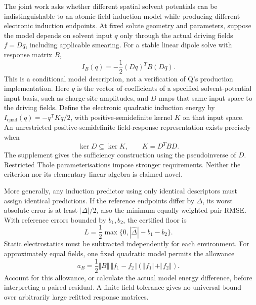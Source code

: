 \documentclass{article}
\begin{document}
The joint work asks whether different spatial solvent potentials can be indistinguishable to an atomic-field induction model while producing different electronic induction endpoints. At fixed solute geometry and parameters, suppose the model depends on solvent input $q$ only through the actual driving fields $f=Dq$, including applicable smearing. For a stable linear dipole solve with response matrix $B$,
\begin{equation*}
I_B(q)=-\frac12(Dq)^TB(Dq).
\end{equation*}
This is a conditional model description, not a verification of Q's production implementation. Here $q$ is the vector of coefficients of a specified solvent-potential input basis, such as charge-site amplitudes, and $D$ maps that same input space to the driving fields. Define the electronic quadratic induction energy by $I_{\mathrm{quad}}(q)=-q^{\mathrm T}Kq/2$, with positive-semidefinite kernel $K$ on that input space. An unrestricted positive-semidefinite field-response representation exists precisely when
\begin{equation*}
\operatorname{ker}D\subseteq\operatorname{ker}K,\qquad K=D^TBD.
\end{equation*}
The supplement gives the sufficiency construction using the pseudoinverse of $D$. Restricted Thole parameterisations impose stronger requirements. Neither the criterion nor its elementary linear algebra is claimed novel.

More generally, any induction predictor using only identical descriptors must assign identical predictions. If the reference endpoints differ by $\Delta$, its worst absolute error is at least $|\Delta|/2$, also the minimum equally weighted pair RMSE. With reference errors bounded by $b_1,b_2$, the certified floor is
\begin{equation*}
L=\frac12\max\{0,|\widehat\Delta|-b_1-b_2\}.
\end{equation*}
Static electrostatics must be subtracted independently for each environment. For approximately equal fields, one fixed quadratic model permits the allowance
\begin{equation*}
a_B=\frac12\Vert B\Vert\,\Vert f_1-f_2\Vert(\Vert f_1\Vert+\Vert f_2\Vert).
\end{equation*}
Account for this allowance, or calculate the actual model energy difference, before interpreting a paired residual. A finite field tolerance gives no universal bound over arbitrarily large refitted response matrices.
\end{document}
